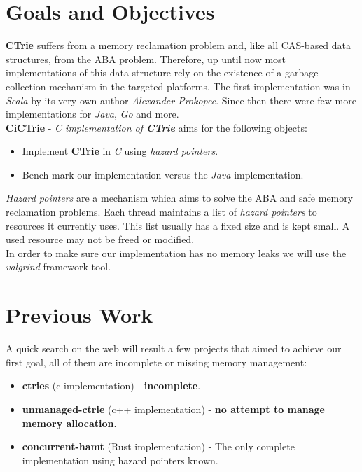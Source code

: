 \documentclass[dvips,12pt]{article}
\begin{document}
	\section{Goals and Objectives}
	\textbf{CTrie} suffers from a memory reclamation problem and, like all CAS-based data structures, from the ABA problem. Therefore, up until now most implementations of this data structure rely on the existence of a garbage collection mechanism in the targeted platforms. The first implementation was in \textit{Scala} by its very own author \textit{Alexander Prokopec}. Since then there were few more implementations for \textit{Java}, \textit{Go} and more. \\
		\textbf{CiCTrie} - \textit{C implementation of \textbf{CTrie}} aims for the following objects:
		\begin{itemize}
			\item Implement \textbf{CTrie} in \textit{C} using \textit{hazard pointers}\cite{hazard}\cite{wiki-hazard}.
			\item Bench mark our implementation versus the \textit{Java} implementation. 
		\end{itemize}
	\textit{Hazard pointers} are a mechanism which aims to solve the ABA and safe memory reclamation problems. Each thread maintains a list of \textit{hazard pointers} to resources it currently uses. This list usually has a fixed size and is kept small. A used resource may not be freed or modified.\\
	In order to make sure our implementation has no memory leaks we will use the \textit{valgrind}\cite{valgrind} framework tool.
	
	\section{Previous Work}	
		A quick search on the web will result a few projects that aimed to achieve our first goal, all of them are incomplete or missing memory management:
		\begin{itemize}
			\item \textbf{ctries}\cite{ctries} (c implementation) - \textbf{incomplete}.
			\item \textbf{unmanaged-ctrie}\cite{unmanaged-ctrie} (c++ implementation) - \textbf{no attempt to manage memory allocation}.
			\item \textbf{concurrent-hamt}\cite{concurrent-hamt} (Rust implementation) - The only complete implementation using hazard pointers known.
		\end{itemize}
		
\end{document}
